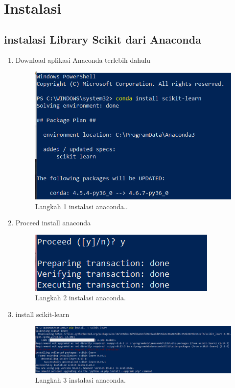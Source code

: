 

\section{Instalasi}
\subsection{instalasi Library Scikit dari Anaconda}
\begin{enumerate}
\item Download aplikasi Anaconda terlebih dahulu
\begin{figure} [ht]
\centering
\includegraphics[scale=1] {figures/1.png}
\caption{Langkah 1 instalasi anaconda..}
\end{figure}

\item Proceed install anaconda 
\begin{figure} [ht]
\centering
\includegraphics[scale=1] {figures/2.png}
\caption{Langkah 2 instalasi anaconda.}
\end{figure}

\item install scikit-learn
\begin{figure} [ht]
\centering 
\includegraphics[scale=1] {figures/4.png}
\caption{Langkah 3 instalasi anaconda. }
\end{figure}


\end{enumerate}
